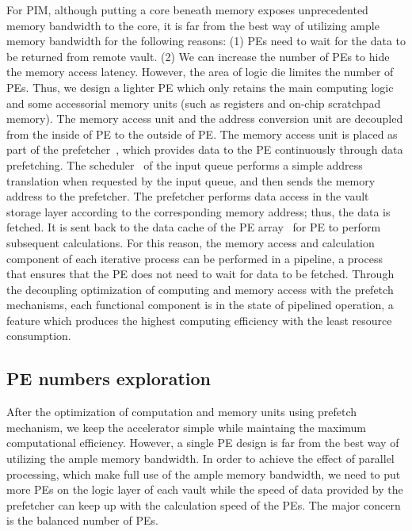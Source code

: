 \documentclass[9pt,conference]{IEEEtran}
\begin{document}
For PIM, although putting a core beneath memory exposes unprecedented memory bandwidth to the core, it is far from the best way of utilizing ample memory bandwidth for the
following reasons: (1) PEs need to wait for the data to be returned from remote vault. (2) We can increase the number of PEs to hide the memory access latency. However, the area of logic die limites the number of PEs. Thus, we design a lighter PE which only retains the main computing logic and some accessorial memory units (such as registers and on-chip scratchpad memory). The memory access unit and the address conversion unit are decoupled from the inside of PE to the outside of PE. The memory access unit is placed as part of the prefetcher~, which provides data to the PE continuously through data prefetching. The scheduler~ of the input queue performs a simple address translation when requested by the input queue, and then sends the memory address to the prefetcher. The prefetcher performs data access in the vault storage layer according to the corresponding memory address; thus, the data is fetched. It is sent back to the data cache of the PE array~ for PE to perform subsequent calculations. For this reason, the memory access and calculation component of each iterative process can be performed in a pipeline, a process that ensures that the PE does not need to wait for data to be fetched. Through the decoupling optimization of computing and memory access with the prefetch mechanisms, each functional component is in the state of pipelined operation, a feature which produces the highest computing efficiency with the least resource consumption.

\subsection{PE numbers exploration}
\label{sec:arch:pe_number}
After the optimization of computation and memory units using prefetch mechanism, we keep the accelerator simple while maintaing the maximum computational efficiency. However, a single PE design is far from the best way of utilizing the ample memory bandwidth. In order to achieve the effect of parallel processing, which make full use of the ample memory bandwidth, we need to put more PEs on the logic layer of each vault while the speed of data provided by the prefetcher can keep up with the calculation speed of the PEs. The major concern is the balanced number of PEs. 
\end{document}
